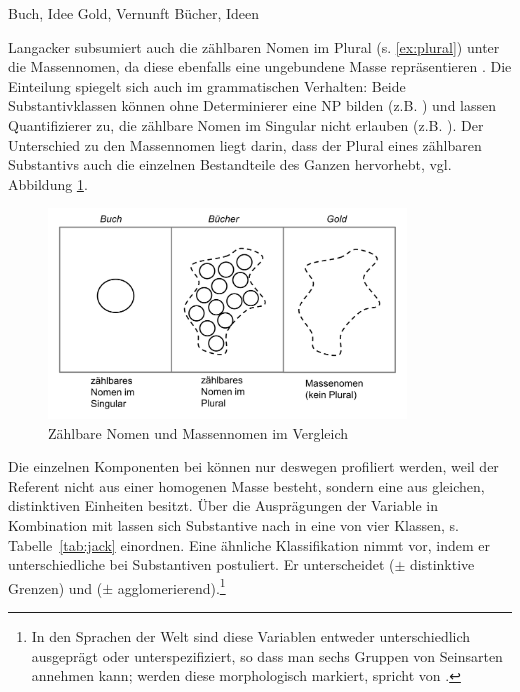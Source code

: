 \begin{exe}
	\ex \label{ex:zaehlbarkeit}
	\begin{xlist}
		\ex \label{ex:count} Buch, Idee
 		\ex \label{ex:mass} Gold, Vernunft
 	 	\ex \label{ex:plural} Bücher, Ideen 
 			\end{xlist}
\end{exe}

\noindent
Langacker subsumiert auch die zählbaren Nomen im Plural (s. \ref{ex:plural}) unter die Massennomen, da diese ebenfalls eine ungebundene Masse repräsentieren \parencite[77]{Langacker1991}. Die Einteilung spiegelt sich auch im grammatischen Verhalten: Beide Substantivklassen können ohne Determinierer eine NP bilden (z.B. ) und lassen Quantifizierer zu, die zählbare Nomen im Singular nicht erlauben (z.B. ). Der Unterschied zu den Massennomen liegt darin, dass der Plural eines zählbaren Substantivs auch die einzelnen Bestandteile des Ganzen hervorhebt, vgl. Abbildung \ref{abb:langacker-nomen}.

\begin{figure}[h]
\begin{center}
\includegraphics[width=9.5cm]{images/langacker-nomen.jpg}
\caption {Zählbare Nomen und Massennomen im Vergleich \\\parencite[s.][78]{Langacker1991}}
\label{abb:langacker-nomen}
\end{center}
\end{figure}


Die einzelnen Komponenten bei  können nur deswegen profiliert werden, weil der Referent nicht aus einer homogenen Masse besteht, sondern eine  \parencite[18]{Jackendoff1991} aus gleichen, distinktiven Einheiten besitzt. Über die Ausprägungen der Variable  in Kombination mit  lassen sich Substantive nach \textcite[20]{Jackendoff1991} in eine von vier Klassen, s. Tabelle~\ref{tab:jack} einordnen. Eine ähnliche Klassifikation nimmt \textcite{Rijkhoff1991,Rijkhoff2002} vor, indem er  unterschiedliche  bei Substantiven postuliert. 
Er unterscheidet  ($\pm$ distinktive Grenzen) und  ($\pm$ agglomerierend).\footnote{In den Sprachen der Welt sind diese Variablen entweder unterschiedlich ausgeprägt oder unterspezifiziert, so dass man sechs Gruppen von Seinsarten annehmen kann; werden diese morphologisch markiert, spricht \textcite[121]{Rijkhoff2002} von .}


